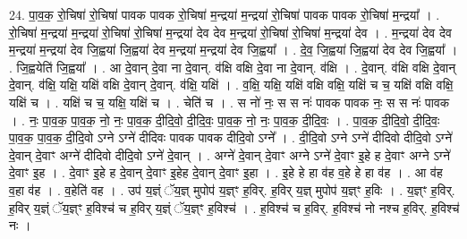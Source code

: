 \documentclass[17pt]{extarticle}
\begin{document}
24. पा॒व॒क॒ रो॒चिषा॑ रो॒चिषा॑ पावक पावक रो॒चिषा॑ म॒न्द्रया॑ म॒न्द्रया॑ रो॒चिषा॑ पावक पावक रो॒चिषा॑ म॒न्द्रया᳚ । . रो॒चिषा॑ म॒न्द्रया॑ म॒न्द्रया॑ रो॒चिषा॑ रो॒चिषा॑ म॒न्द्रया॑ देव देव म॒न्द्रया॑ रो॒चिषा॑ रो॒चिषा॑ म॒न्द्रया॑ देव । . म॒न्द्रया॑ देव देव म॒न्द्रया॑ म॒न्द्रया॑ देव जि॒ह्वया॑ जि॒ह्वया॑ देव म॒न्द्रया॑ म॒न्द्रया॑ देव जि॒ह्वया᳚ । . दे॒व॒ जि॒ह्वया॑ जि॒ह्वया॑ देव देव जि॒ह्वया᳚ । . जि॒ह्वयेति॑ जि॒ह्वया᳚ । . आ दे॒वान् दे॒वा ना दे॒वान्. व॑क्षि वक्षि दे॒वा ना दे॒वान्. व॑क्षि । . दे॒वान्. व॑क्षि वक्षि दे॒वान् दे॒वान्. व॑क्षि॒ यक्षि॒ यक्षि॑ वक्षि दे॒वान् दे॒वान्. व॑क्षि॒ यक्षि॑ । . व॒क्षि॒ यक्षि॒ यक्षि॑ वक्षि वक्षि॒ यक्षि॑ च च॒ यक्षि॑ वक्षि वक्षि॒ यक्षि॑ च । . यक्षि॑ च च॒ यक्षि॒ यक्षि॑ च । . चेति॑ च । . स नो॑ नः॒ स स नः॑ पावक पावक नः॒ स स नः॑ पावक । . नः॒ पा॒व॒क॒ पा॒व॒क॒ नो॒ नः॒ पा॒व॒क॒ दी॒दि॒वो॒ दी॒दि॒वः॒ पा॒व॒क॒ नो॒ नः॒ पा॒व॒क॒ दी॒दि॒वः॒ । . पा॒व॒क॒ दी॒दि॒वो॒ दी॒दि॒वः॒ पा॒व॒क॒ पा॒व॒क॒ दी॒दि॒वो ऽग्ने ऽग्ने॑ दीदिवः पावक पावक दीदि॒वो ऽग्ने᳚ । . दी॒दि॒वो ऽग्ने ऽग्ने॑ दीदिवो दीदि॒वो ऽग्ने॑ दे॒वान् दे॒वाꣳ अग्ने॑ दीदिवो दीदि॒वो ऽग्ने॑ दे॒वान् । . अग्ने॑ दे॒वान् दे॒वाꣳ अग्ने ऽग्ने॑ दे॒वाꣳ इ॒हे ह दे॒वाꣳ अग्ने ऽग्ने॑ दे॒वाꣳ इ॒ह । . दे॒वाꣳ इ॒हे ह दे॒वान् दे॒वाꣳ इ॒हेह दे॒वान् दे॒वाꣳ इ॒हा । . इ॒हे हे हा व॑ह व॒हे हे हा व॑ह । . आ व॑ह व॒हा व॑ह । . व॒हेति॑ वह । . उप॑ य॒ज्ञ्ं ॅय॒ज्ञ् मुपोप॑ य॒ज्ञ्ꣳ ह॒विर्. ह॒विर् य॒ज्ञ् मुपोप॑ य॒ज्ञ्ꣳ ह॒विः । . य॒ज्ञ्ꣳ ह॒विर्. ह॒विर् य॒ज्ञ्ं ॅय॒ज्ञ्ꣳ ह॒विश्च॑ च ह॒विर् य॒ज्ञ्ं ॅय॒ज्ञ्ꣳ ह॒विश्च॑ । . ह॒विश्च॑ च ह॒विर्. ह॒विश्च॑ नो नश्च ह॒विर्. ह॒विश्च॑ नः । \newline
\end{document}
